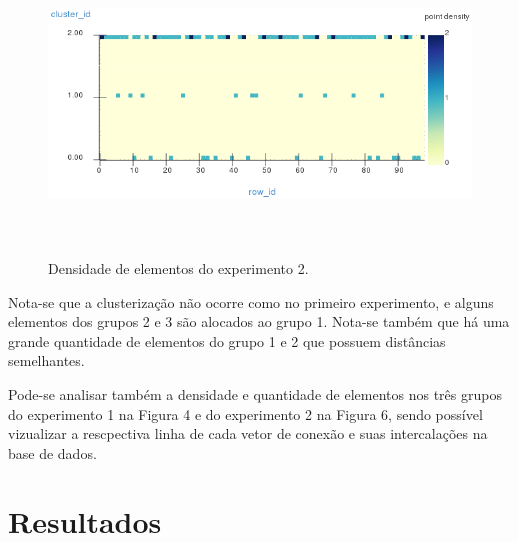 \begin{figure}[!h]
\centering
\includegraphics[width = 14cm, height = 8cm]{figuras/densidade1.png}
\caption{\scriptsize{Densidade de elementos do experimento 2.}}
\end{figure}

\indent Nota-se que a clusterização não ocorre como no primeiro experimento, e alguns elementos dos grupos 2 e 3 são alocados ao grupo 1. Nota-se também que há uma grande quantidade de elementos do grupo 1 e 2 que possuem distâncias semelhantes.

\indent Pode-se analisar também a densidade e quantidade de elementos nos três grupos do experimento 1 na Figura 4 e do experimento 2 na Figura 6, sendo possível vizualizar a rescpectiva linha de cada vetor de conexão e suas intercalações na base de dados.

\newpage
    \section{Resultados}
